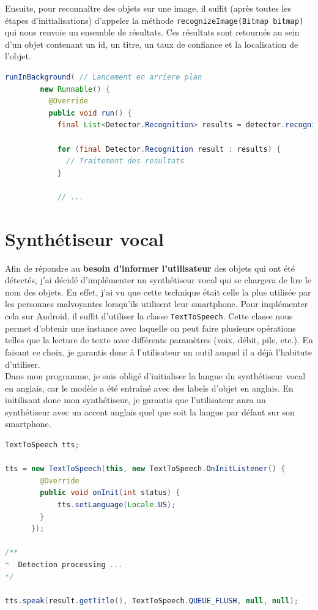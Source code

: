 \documentclass[UTF8]{EPURapport}
\begin{document}
Ensuite, pour reconnaître des objets sur une image, il suffit (après toutes les étapes d'initialisations) d'appeler la méthode \verb|recognizeImage(Bitmap bitmap)| qui nous renvoie un ensemble de résultats. Ces résultats sont retournés au sein d'un objet contenant un id, un titre, un taux de confiance et la localisation de l'objet.\\

\begin{lstlisting}[language=Java]
 runInBackground( // Lancement en arriere plan
        new Runnable() {
          @Override
          public void run() {
            final List<Detector.Recognition> results = detector.recognizeImage(croppedBitmap); // Traitement

        	for (final Detector.Recognition result : results) {
              // Traitement des resultats
            }

        	// ...
\end{lstlisting}

\section{Synthétiseur vocal}

Afin de répondre au \textbf{besoin d'informer l'utilisateur} des objets qui ont été détectés, j'ai décidé d'implémenter un synthétiseur vocal qui se chargera de lire le nom des objets. En effet, j'ai vu que cette technique était celle la plus utilisée par les personnes malvoyantes lorsqu'ils utilisent leur smartphone. Pour implémenter cela sur Android, il suffit d'utiliser la classe \verb|TextToSpeech|. Cette classe nous permet d'obtenir une instance avec laquelle on peut faire plusieurs opérations telles que la lecture de texte avec différents paramètres (voix, débit, pile, etc.). En faisant ce choix, je garantis donc à l'utilisateur un outil auquel il a déjà l'habitute d'utiliser. \\

Dans mon programme, je suis obligé d'initialiser la langue du synthétiseur vocal en anglais, car le modèle a été entraîné avec des labels d'objet en anglais. En initilisant donc mon synthétiseur, je garantis que l'utilisateur aura un synthétiseur avec un accent anglais quel que soit la langue par défaut sur son smartphone. \\

\begin{lstlisting}[language=Java]
TextToSpeech tts;

tts = new TextToSpeech(this, new TextToSpeech.OnInitListener() {
        @Override
        public void onInit(int status) {
      		tts.setLanguage(Locale.US);
        }
      });

/**
*  Detection processing ...
*/

tts.speak(result.getTitle(), TextToSpeech.QUEUE_FLUSH, null, null);
\end{lstlisting}
\end{document}

